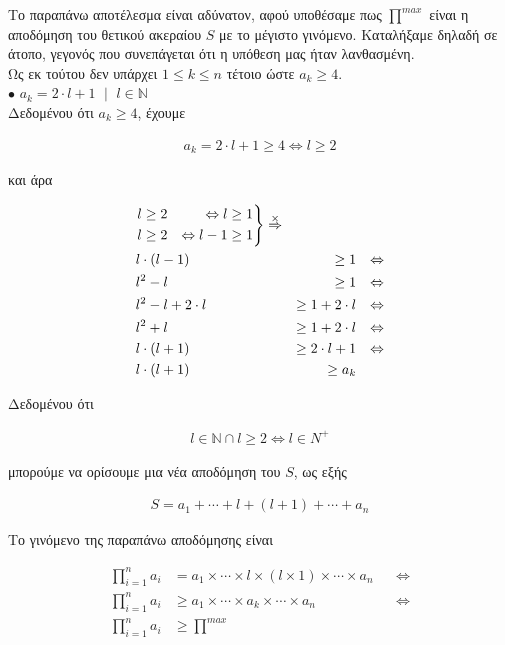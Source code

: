 \documentclass[12pt]{article}
\newcommand{\N}{\mathbb{N}}
\newcommand{\margin}{\hspace{4pt}}
\newcommand{\centered}[1]{\begin{align*}#1\end{align*}}
\newenvironment{rcases}
	{\left.\begin{aligned}}
	{\end{aligned}\right\rbrace}
\begin{document}
Το παραπάνω αποτέλεσμα είναι αδύνατον, αφού υποθέσαμε πως \( \stackrel{max}{\prod} \) είναι η αποδόμηση του θετικού ακεραίου
\( S \) με το μέγιστο γινόμενο. Καταλήξαμε δηλαδή σε άτοπο, γεγονός που συνεπάγεται ότι η υπόθεση μας ήταν λανθασμένη. \\

Ως εκ τούτου δεν υπάρχει \( 1 \leq k \leq n \) τέτοιο ώστε \( a_k \geq 4 \). \\

\( \bullet \) \( a_k = 2 \cdot l + 1 \margin \mid \margin l \in \N \) \\

Δεδομένου ότι \( a_k \geq 4 \), έχουμε

\centered{a_k = 2 \cdot l + 1 \geq 4 \Leftrightarrow l \geq 2}

και άρα

\begin{align*}
    &\begin{rcases}
        l & \geq 2 & \Leftrightarrow l & \geq 1 \\
        l & \geq 2 & \Leftrightarrow l - 1 & \geq 1 \\
    \end{rcases}
    \stackrel{\times}{\Rightarrow} \\
    &l \cdot (l - 1) & \geq 1 && \Leftrightarrow \\
    &l^2 - l & \geq 1 && \Leftrightarrow \\
    &l^2 - l + 2 \cdot l & \geq 1 + 2 \cdot l && \Leftrightarrow \\
    &l^2 + l & \geq 1 + 2 \cdot l && \Leftrightarrow \\
    &l \cdot (l + 1) & \geq 2 \cdot l + 1 && \Leftrightarrow \\
    &l \cdot (l + 1) & \geq a_k
\end{align*}

Δεδομένου ότι

\centered{l \in \N \cap l \geq 2 \Leftrightarrow l \in N^+}

μπορούμε να ορίσουμε μια νέα αποδόμηση του \( S \), ως εξής

\centered{S = a_1 + \dotsb + l + (l + 1) + \dotsb + a_n}

Το γινόμενο της παραπάνω αποδόμησης είναι

\begin{align*}
    \prod_{i = 1}^{n} a_i & = a_1 \times \dotsb \times l \times (l \times 1) \times \dotsb \times a_n && \Leftrightarrow \\
    \prod_{i = 1}^{n} a_i & \geq a_1 \times \dotsb \times a_k \times \dotsb \times a_n && \Leftrightarrow \\
    \prod_{i = 1}^{n} a_i & \geq \stackrel{max}{\prod}
\end{align*}
\end{document}
